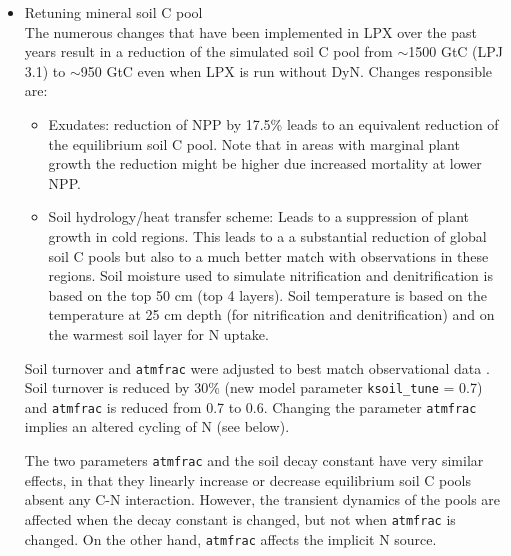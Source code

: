 \begin{itemize} 
  \item \textsf{Retuning mineral soil C pool}\\
The numerous changes that have been implemented in LPX over the past years result in a reduction of the simulated soil C pool from $\sim$1500 GtC (LPJ 3.1) to $\sim$950 GtC even when LPX is run without DyN. Changes responsible are: 
\begin{itemize}
      \item Exudates: reduction of NPP by 17.5\% leads to an equivalent reduction of the equilibrium soil C pool. Note that in areas with marginal plant growth the reduction might be higher due increased mortality at lower NPP.
      \item Soil hydrology/heat transfer scheme: Leads to a suppression of plant growth in cold regions. This leads to a a substantial reduction of global soil C pools but also to a much better match with observations in these regions. Soil moisture used to simulate nitrification and denitrification is based on the top 50 cm (top 4 layers). Soil temperature is based on the temperature at 25 cm depth (for nitrification and denitrification) and on the warmest soil layer for N uptake.
    \end{itemize}
Soil turnover and {\tt atmfrac} were adjusted to best match observational data \citep{batjes08, tarnocai09gbc}. Soil turnover is reduced by 30\% (new model parameter {\tt ksoil\_tune} = 0.7) and {\tt atmfrac} is reduced from 0.7 to 0.6. Changing the parameter {\tt atmfrac} implies an altered cycling of N (see below).


The two parameters {\tt atmfrac} and the soil decay constant have very similar effects, in that they linearly increase or decrease equilibrium soil C pools absent any C-N interaction. However, the transient dynamics of the pools are affected when the decay constant is changed, but not when {\tt atmfrac} is changed. On the other hand, {\tt atmfrac} affects the implicit N source. 


\end{itemize}
